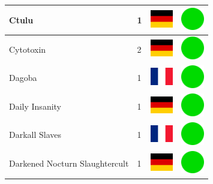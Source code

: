 \documentclass[12pt, a4paper, twoside]{report}
\begin{document}
\begin{center}
\begin{longtable}{|p{5cm}|p{2cm}|p{2cm}|p{2cm}|}
			Ctulu & 1 & \includegraphics[width=1cm]{4x3/de} & \includegraphics[width=1cm]{likes/y} \\ \hline
			Cytotoxin & 2 & \includegraphics[width=1cm]{4x3/de} & \includegraphics[width=1cm]{likes/y} \\ \hline
			Dagoba & 1 & \includegraphics[width=1cm]{4x3/fr} & \includegraphics[width=1cm]{likes/y} \\ \hline
			Daily Insanity & 1 & \includegraphics[width=1cm]{4x3/de} & \includegraphics[width=1cm]{likes/y} \\ \hline
			Darkall Slaves & 1 & \includegraphics[width=1cm]{4x3/fr} & \includegraphics[width=1cm]{likes/y} \\ \hline
			Darkened Nocturn Slaughtercult & 1 & \includegraphics[width=1cm]{4x3/de} & \includegraphics[width=1cm]{likes/y} \\ \hline

\end{longtable}
\end{center}
\end{document}
